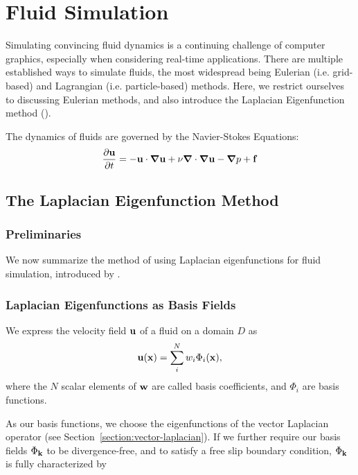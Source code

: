 \chapter{Fluid Simulation}
Simulating convincing fluid dynamics is a continuing challenge of computer
graphics, especially when considering real-time applications. There are multiple
established ways to simulate fluids, the most widespread being Eulerian (i.e.
grid-based) and Lagrangian (i.e. particle-based) methods. Here, we restrict
ourselves to discussing Eulerian methods, and also introduce the Laplacian
Eigenfunction method (\cite{dewitt}).

The dynamics of fluids are governed by the Navier-Stokes Equations:
\begin{equation}
    \label{eq:NSE}
    \begin{aligned}
        \pdv{\vb{u}}{t} = -\vb{u}\cdot\grad{\vb{u}} + 
        \nu \grad\cdot\grad \vb{u} - \grad{p} + \vb{f}
    \end{aligned}
\end{equation}

\section{The Laplacian Eigenfunction Method}
\subsection{Preliminaries}
We now summarize the method of using Laplacian eigenfunctions for fluid
simulation, introduced by \citet{dewitt}.

\subsection*{Laplacian Eigenfunctions as Basis Fields}
We express the velocity field $\vb{u}$ of a fluid on a domain $D$ as
$$\vb{u}(\vb{x})=\sum_i^N w_i \Phi_i(\vb{x}),$$
where the $N$ scalar elements of $\vb{w}$ are called basis coefficients, and
${\Phi_i}$ are basis functions.

As our basis functions, we choose the eigenfunctions of the vector Laplacian
operator (see Section~\ref{section:vector-laplacian}). If we further require our
basis fields $\Phi_{\vb{k}}$ to be divergence-free, and to satisfy a free slip
boundary condition, $\Phi_{\vb{k}}$ is fully characterized by

